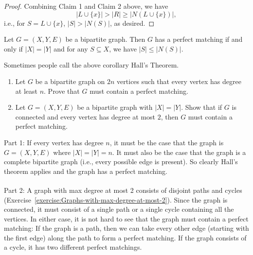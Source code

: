 \begin{flex}
\begin{proof}
Combining Claim 1 and Claim 2 above, we have $$|L \cup \{x\}| > |R| \geq |N(L \cup \{x\})|,$$ i.e., for $S = L \cup \{x\}$, $|S| > |N(S)|$, as desired.
\end{proof}
\end{flex}


\begin{corollary} \label{corollary:Characterization-of-bipartite-graphs-with-perfect-matchings}
Let $G = (X,Y,E)$ be a bipartite graph. Then $G$ has a perfect matching if and only if $|X| = |Y|$ and for any $S \subseteq X$, we have $|S| \leq |N(S)|$.
\end{corollary}


\begin{note} \label{note:Halls-Theorem-when-the-two-parts-have-equal-size}
Sometimes people call the above corollary Hall's Theorem.
\end{note}


\begin{flex}
\begin{exercise} \label{exercise:Practice-with-perfect-matchings}
\begin{enumerate}
     \item Let $G$ be a bipartite graph on $2n$ vertices such that every vertex has degree at least $n$. Prove that $G$ must contain a perfect matching.
     \item Let $G = (X,Y,E)$ be a bipartite graph with $|X| = |Y|$. Show that if $G$ is connected and every vertex has degree at most $2$, then $G$ must contain a perfect matching.   
\end{enumerate}
\end{exercise}

\begin{solution}
Part 1: If every vertex has degree $n$, it must be the case that the graph is $G=(X,Y,E)$ where $|X| = |Y| = n$. It must also be the case that the graph is a complete bipartite graph (i.e., every possible edge is present). So clearly Hall's theorem applies and the graph has a perfect matching.
\\\\
\noindent
Part 2: A graph with max degree at most 2 consists of disjoint paths and cycles (Exercise~\ref{exercise:Graphs-with-max-degree-at-most-2}). Since the graph is connected, it must consist of a single path or a single cycle containing all the vertices. In either case, it is not hard to see that the graph must contain a perfect matching: If the graph is a path, then we can take every other edge (starting with the first edge) along the path to form a perfect matching. If the graph consists of a cycle, it has two different perfect matchings. 
\end{solution}
\end{flex}



